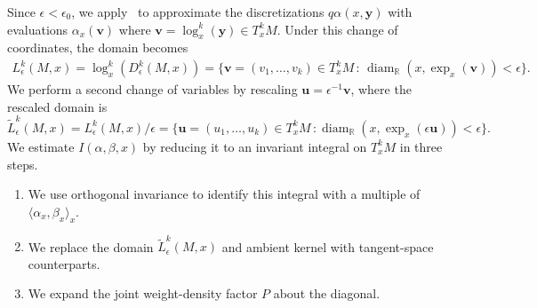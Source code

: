 \documentclass[11pt,reqno]{amsproc}
\numberwithin{equation}{section}
\newcommand{\R}{\mathbb{R}}
\newcommand{\by}{\mathbf{y}}
\newcommand{\bu}{\mathbf{u}}
\newcommand{\bv}{\mathbf{v}}
\newcommand{\tL}{\widetilde{L}}
\newcommand{\diam}{\operatorname{diam}}
\theoremstyle{definition}
\theoremstyle{plain}
\begin{document}
    Since $\epsilon<\epsilon_0$, we apply~ to approximate the discretizations $q\alpha(x,\by)$ with evaluations $\alpha_x(\bv)$ where $\bv = \log_x^k(\by) \in T^k_x M$.
    Under this change of coordinates, the domain becomes 
    \begin{align} \label{eq:L^k}
        L^k_\epsilon(M,x) = \log^k_x(D^k_\epsilon(M,x)) = \{\bv = (v_1, \ldots, v_k) \in T^k_x M \, : \, \diam_\R(x, \exp_x(\bv)) < \epsilon\}.
    \end{align}
    We perform a second change of variables by rescaling $\bu = \epsilon^{-1} \bv$, where the rescaled domain is
    \begin{equation} \label{eq:tL_domain}
        \tL^k_\epsilon(M,x) = L^k_\epsilon(M,x)/\epsilon = \{\bu = (u_1, \ldots, u_k) \in T^k_x M \, : \diam_\R(x, \exp_x(\epsilon\bu)) < \epsilon\}. 
    \end{equation}
    We estimate $I(\alpha, \beta, x)$ by reducing it to an invariant integral on $T^k_x M$ in three steps.
    \begin{enumerate}
        \item We use orthogonal invariance to identify this integral with a multiple of $\langle \alpha_x, \beta_x \rangle_x$.
        \item We replace the domain $\tL^k_\epsilon(M,x)$ and ambient kernel with tangent-space counterparts.
        \item We expand the joint weight-density factor $P$ about the diagonal.
    \end{enumerate}
\end{document}
